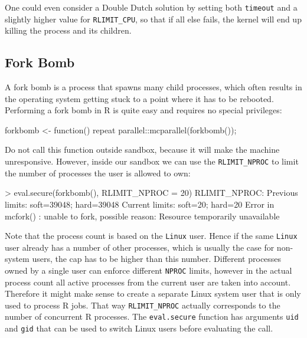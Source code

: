 \documentclass[article]{jss}
\newcommand{\R}{\textsf{R}\xspace}
\newcommand{\Linux}{\texttt{Linux}\xspace}
\begin{document}
\begin{appendices}
One could even consider a Double Dutch solution by setting both \texttt{timeout}
and a slightly higher value for \texttt{RLIMIT\_CPU}, so that if all else fails,
the kernel will end up killing the process and its children.

\subsection{Fork Bomb}

A fork bomb is a process that spawns many child processes, which often results
in the operating system getting stuck to a point where it has to be rebooted.
Performing a fork bomb in \R is quite easy and requires no special privileges:
\begin{CodeChunk}
\begin{CodeInput}
forkbomb <- function(){
  repeat{
    parallel::mcparallel(forkbomb());
  }
}
\end{CodeInput}
\end{CodeChunk}
Do not call this function outside sandbox, because it will make the machine
unresponsive. However, inside our sandbox we can use the \texttt{RLIMIT\_NPROC}
to limit the number of processes the user is allowed to own:
\begin{CodeChunk}
\begin{CodeInput}
> eval.secure(forkbomb(), RLIMIT_NPROC = 20)
RLIMIT_NPROC:
Previous limits: soft=39048; hard=39048
Current limits: soft=20; hard=20
Error in mcfork() :
  unable to fork, possible reason: Resource temporarily unavailable
\end{CodeInput}
\end{CodeChunk}
Note that the process count is based on the \Linux user. Hence if the same
\Linux user already has a number of other processes, which is usually the case for
non-system users, the cap has to be higher than this number. Different
processes owned by a single user can enforce different \texttt{NPROC} limits,
however in the actual process count all active processes from the current user
are taken into account. Therefore it might make sense to create a separate
Linux system user that is only used to process \R jobs. That way
\texttt{RLIMIT\_NPROC} actually corresponds to the number of concurrent \R processes. The \texttt{eval.secure}
function has arguments \texttt{uid} and \texttt{gid} that can be used to switch
Linux users before evaluating the call.


\end{appendices}




\end{document}
